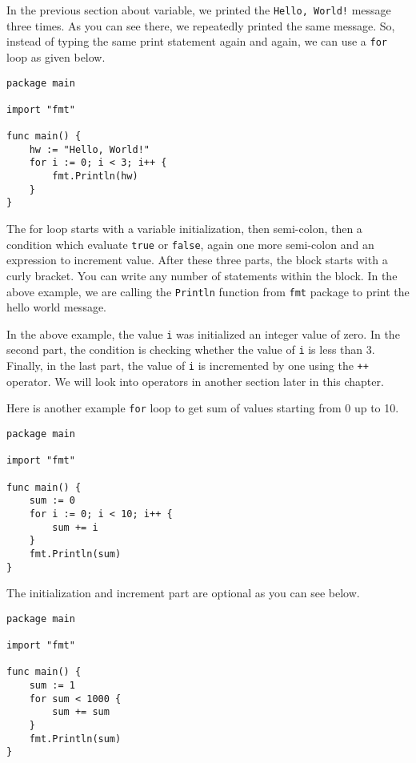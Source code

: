 In the previous section about variable, we printed the \texttt{Hello,
World!}  message three times.  As you can see there, we repeatedly
printed the same message.  So, instead of typing the same print
statement again and again, we can use a \texttt{for} loop as given
below.

\begin{lstlisting}[caption=For loop (sum1.go)]
package main

import "fmt"

func main() {
    hw := "Hello, World!"
    for i := 0; i < 3; i++ {
        fmt.Println(hw)
    }
}
\end{lstlisting}

The for loop starts with a variable initialization, then semi-colon,
then a condition which evaluate \texttt{true} or \texttt{false}, again
one more semi-colon and an expression to increment value.  After these
three parts, the block starts with a curly bracket.  You can write any
number of statements within the block.  In the above example, we are
calling the \texttt{Println} function from \texttt{fmt} package to
print the hello world message.

In the above example, the value \texttt{i} was initialized an integer
value of zero.  In the second part, the condition is checking whether
the value of \texttt{i} is less than 3.  Finally, in the last part,
the value of \texttt{i} is incremented by one using the \texttt{++}
operator.  We will look into operators in another section later in
this chapter.

Here is another example \texttt{for} loop to get sum of values
starting from 0 up to 10.

\begin{lstlisting}[caption=For loop (sum2.go)]
package main

import "fmt"

func main() {
    sum := 0
    for i := 0; i < 10; i++ {
        sum += i
    }
    fmt.Println(sum)
}
\end{lstlisting}

The initialization and increment part are optional as you can see
below.

\begin{lstlisting}[caption=For loop (sum3.go)]
package main

import "fmt"

func main() {
    sum := 1
    for sum < 1000 {
        sum += sum
    }
    fmt.Println(sum)
}
\end{lstlisting}

